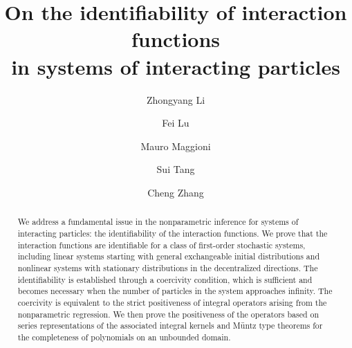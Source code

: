 \documentclass[]{elsarticle}
\numberwithin{equation}{section}
\numberwithin{theorem}{section}
\begin{document}
\begin{frontmatter}

\title{On the identifiability of interaction functions\\ in systems of interacting particles}


\author[address1]{Zhongyang Li} 
\author[address2,address3]{Fei Lu} 
\author[address2,address3]{Mauro Maggioni} 
\author[address4]{Sui Tang}
\author[address5]{Cheng Zhang}

 
\address[address1]{Department of Mathematics,  university of California Santa Barbara, Isla Vista, USA 93117}
\address[address2]{Department of Mathematics,  University of Connecticut, Storrs, CT, USA 06269}
\address[address3]{Department of Mathematics, Johns Hopkins University, Baltimore, MD, USA, 21218}
\address[address4]{Department of Applied Mathematics and Statistics, Johns Hopkins University, Baltimore, MD, USA, 21218}
\address[address5]{Department of Mathematics, University of Rochester, Rochester, NY 14627}


\begin{abstract}
We address a fundamental issue in the nonparametric inference for systems of interacting particles: the identifiability of the interaction functions. 
We prove that the interaction functions are identifiable for a class of first-order stochastic systems, including linear systems starting with general exchangeable initial distributions and nonlinear systems with stationary distributions in the decentralized directions. The identifiability is established through a coercivity condition, which is sufficient and becomes necessary when the number of particles in the system approaches infinity. The coercivity is equivalent to the strict positiveness of integral operators arising from the nonparametric regression. We then prove the positiveness of the operators based on series representations of the associated integral kernels and M\"untz type theorems for the completeness of polynomials on an unbounded domain. 
\end{abstract}


\end{frontmatter}
\end{document}
